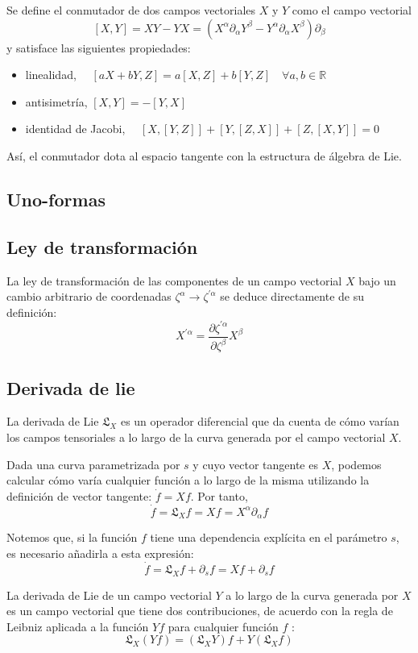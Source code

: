 Se define el conmutador de dos campos vectoriales $X$ y $Y$ como el campo vectorial
$$
[X, Y]=X Y-Y X=\left(X^{\alpha} \partial_{\alpha} Y^{\beta}-Y^{\alpha} \partial_{\alpha} X^{\beta}\right) \partial_{\beta}
$$
y satisface las siguientes propiedades:
\begin{itemize}
  \item linealidad, $\quad[a X+b Y, Z]=a[X, Z]+b[Y, Z] \quad \forall a, b \in \mathbb{R}$
  \item antisimetría, $[X, Y]=-[Y, X]$
  \item identidad de Jacobi, $\quad[X,[Y, Z]]+[Y,[Z, X]]+[Z,[X, Y]]=0$
\end{itemize}


Así, el conmutador dota al espacio tangente con la estructura de álgebra de Lie.
\subsection{Uno-formas}
\subsection{Ley de transformación}
La ley de transformación de las componentes de un campo vectorial $X$ bajo un cambio arbitrario de coordenadas $\zeta^{\alpha} \rightarrow \zeta^{\prime \alpha}$ se deduce directamente de su definición:
$$
X^{\prime \alpha}=\frac{\partial \zeta^{\prime \alpha}}{\partial \zeta^{\beta}} X^{\beta}
$$
\subsection{Derivada de lie}
La derivada de Lie $\mathfrak{L}_{X}$ es un operador diferencial que da cuenta de cómo varían los campos tensoriales a lo largo de la curva generada por el campo vectorial $X$.

Dada una curva parametrizada por $s$ y cuyo vector tangente es $X$, podemos calcular cómo varía cualquier función a lo largo de la misma utilizando la definición de vector tangente: $\dot{f}=X f$. Por tanto,
$$
\dot{f}=\mathfrak{L}_{X} f=X f=X^{\alpha} \partial_{\alpha} f
$$

Notemos que, si la función $f$ tiene una dependencia explícita en el parámetro $s$, es necesario añadirla a esta expresión:
$$
\dot{f}=\mathfrak{L}_{X} f+\partial_{s} f=X f+\partial_{s} f
$$

La derivada de Lie de un campo vectorial $Y$ a lo largo de la curva generada por $X$ es un campo vectorial que tiene dos contribuciones, de acuerdo con la regla de Leibniz aplicada a la función $Y f$ para cualquier función $f$ :
$$
\mathfrak{L}_{X}(Y f)=\left(\mathfrak{L}_{X} Y\right) f+Y\left(\mathfrak{L}_{X} f\right)
$$

